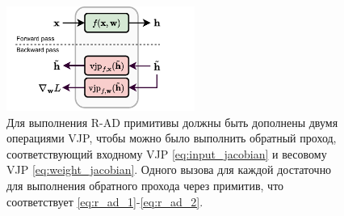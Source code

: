 \begin{figure}
    \centering
    \includegraphics[width=0.55\textwidth]{images/backward_pass-Pagina-2.pdf}
    \caption{Для выполнения R-AD примитивы должны быть дополнены двумя операциями VJP, чтобы можно было выполнить обратный проход, соответствующий входному VJP \eqref{eq:input_jacobian} и весовому VJP \eqref{eq:weight_jacobian}. Одного вызова для каждой достаточно для выполнения обратного прохода через примитив, что соответствует \eqref{eq:r_ad_1}-\eqref{eq:r_ad_2}.}
    \label{fig:backward_pass}
\end{figure}

